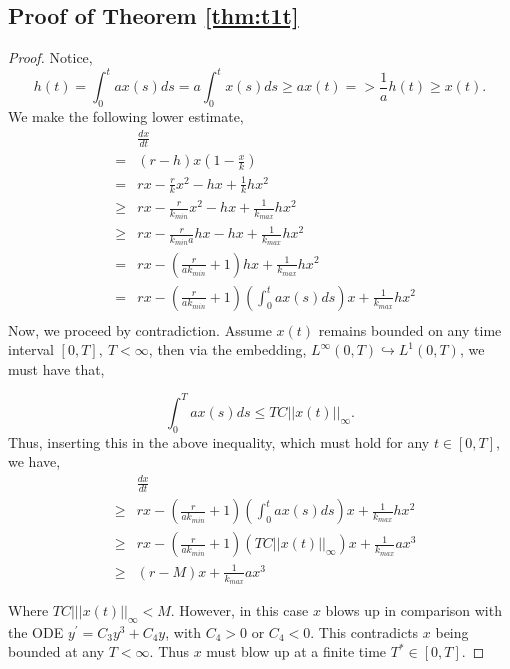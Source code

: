 \documentclass[sn-mathphys-num]{sn-jnl}
\numberwithin{equation}{section}
\numberwithin{equation}{section}
\begin{document}
\subsection{Proof of Theorem \ref{thm:t1t}}
\begin{proof}
\label{proof_thm:t1t}
Notice, 
\begin{equation}
\label{eq:3}
h(t) = \int^{t}_{0}a x(s)ds = a \int^{t}_{0} x(s)ds \geq a x(t) => \frac{1}{a}h(t) \geq x(t).
\end{equation}
We make the following lower estimate,
\begin{eqnarray}
&& \frac{dx}{dt} \nonumber \\
&=& (r-h)x\left(1-\frac{x}{k}\right)  \nonumber \\
&=& r x - \frac{r}{k}x^{2} - h x + \frac{1}{k}hx^{2} \nonumber \\
&\geq& r x - \frac{r}{k_{min}}x^{2} - h x + \frac{1}{k_{max}}hx^{2} \nonumber \\
&\geq&  r x - \frac{r}{ k_{min} a} h x - h x + \frac{1}{k_{max}}hx^{2} \nonumber \\
&=& r x -\left( \frac{r}{a k_{min}}  + 1\right) h x + \frac{1}{k_{max}}hx^{2} \nonumber \\
&=& r x -\left( \frac{r}{a k_{min}}  + 1\right) 
\left( \int^{t}_{0}a x(s)ds \right) x + \frac{1}{k_{max}}hx^{2} \nonumber \\
\end{eqnarray}
Now, we proceed by contradiction. Assume $x(t)$ remains bounded on any time interval $[0,T], \ T < \infty$, then via the embedding, $L^{\infty}(0,T) \hookrightarrow L^{1}(0,T)$, we must have that,

\begin{equation}
\label{eq:3e}
 \int^{T}_{0}a x(s)ds \leq T C ||x(t)||_{\infty}.
\end{equation}
Thus, inserting this in the above inequality, which must hold for any $t \in [0, T]$, we have,
\begin{eqnarray}
&& \frac{dx}{dt} \nonumber \\
&\geq& r x -\left( \frac{r}{a k_{min}}  + 1\right) 
\left( \int^{t}_{0}a x(s)ds \right) x + \frac{1}{k_{max}}hx^{2} \nonumber \\
&\geq& r x -\left( \frac{r}{a k_{min}}  + 1\right) 
\left(  T C ||x(t)||_{\infty} \right) x + \frac{1}{k_{max}}ax^{3} \nonumber \\
&\geq& (r-M)x + \frac{1}{k_{max}}ax^{3}
\end{eqnarray}

Where $T C |||x(t)||_{\infty} < M$. However, in this case $x$ blows up in comparison with the ODE $\boxed{y^{'} = C_{3}y^{3} + C_{4}y}$,  with $C_{4} > 0$ or $C_{4} < 0$. This contradicts $x$ being bounded at any $T < \infty$. Thus $x$ must blow up at a finite time $T^{*} \in [0,T]$.
\end{proof}
\end{document}
